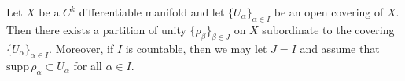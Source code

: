 Let $X$ be a $C^k$ differentiable manifold and let $\{U_\alpha\}_{\alpha \in I}$ be an open covering of $X$. Then there exists a partition of unity $\{\rho_\beta\}_{\beta \in J}$ on $X$ subordinate to the covering $\{U_\alpha\}_{\alpha \in I}$. Moreover, if $I$ is countable, then we may let $J = I$ and assume that $\mathrm{supp}\,\rho_\alpha \subset U_\alpha$ for all $\alpha \in I$.
